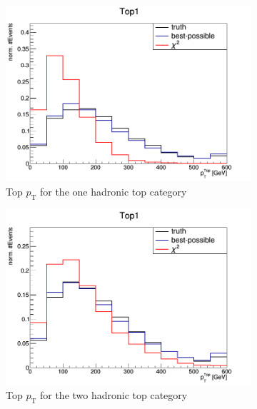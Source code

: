 \begin{figure}[H]
\begin{subfigure}{.5\textwidth}
  \centering
  \includegraphics[width=.99\linewidth]{figs/HadTop/pt1hadtop1}
  \caption{Top $p_{\text{T}}$ for the one hadronic top category}
  \label{fig:pthad1}
\end{subfigure}%
\begin{subfigure}{.5\textwidth}
  \centering
  \includegraphics[width=.99\linewidth]{figs/HadTop/pt2hadtop1}
  \caption{Top $p_{\text{T}}$ for the two hadronic top category}
  \label{fig:pthad2}
\end{subfigure}
\begin{subfigure}{.5\textwidth}
  \centering

\end{subfigure}
\end{figure}
